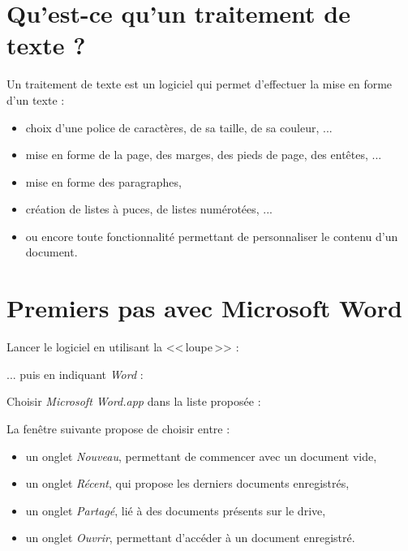 \section{Qu'est-ce qu'un traitement de texte ?} 

Un traitement de texte est un logiciel qui permet d'effectuer la mise en forme d'un texte : 
\begin{itemize}
\item choix d'une police de caractères, de sa taille, de sa couleur, ...
\item mise en forme de la page, des marges, des pieds de page, des entêtes, ... 
\item mise en forme des paragraphes, 
\item création de listes à puces, de listes numérotées, ...
\item ou encore toute fonctionnalité permettant de personnaliser le contenu d'un document.
\end{itemize}




\section{Premiers pas avec Microsoft Word}

Lancer le logiciel en utilisant la <<\,loupe\,>> :


... puis en indiquant \emph{Word} :


Choisir \emph{Microsoft Word.app} dans la liste proposée :


La fenêtre suivante propose de choisir entre :
\begin{itemize}
\item un onglet \emph{Nouveau}, permettant de commencer avec un document vide,
\item un onglet \emph{Récent}, qui propose les derniers documents enregistrés,
\item un onglet \emph{Partagé}, lié à des documents présents sur le drive,
\item un onglet \emph{Ouvrir}, permettant d'accéder à un document enregistré.
\end{itemize}

